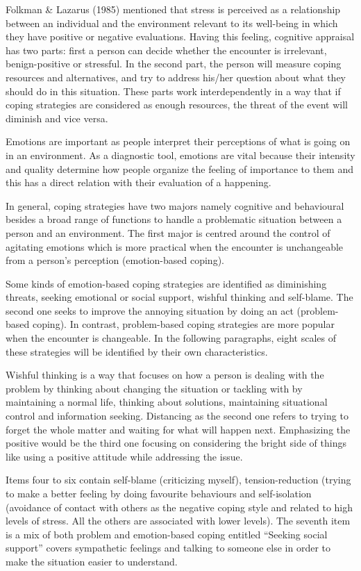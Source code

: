 \documentclass[
11pt, %
oneside, %
english, %
singlespacing, %
]{macthesis} %
\begin{document}
Folkman \& Lazarus (1985) mentioned that stress is perceived as a relationship between an individual and the environment relevant to its well-being in which they have positive or negative evaluations. Having this feeling, cognitive appraisal has two parts: first a person can decide whether the encounter is irrelevant, benign-positive or stressful. In the second part, the person will measure coping resources and alternatives, and try to address his/her question about what they should do in this situation. These parts work interdependently in a way that if coping strategies are considered as enough resources, the threat of the event will diminish and vice versa.

Emotions are important as people interpret their perceptions of what is going on in an environment. As a diagnostic tool, emotions are vital because their intensity and quality determine how people organize the feeling of importance to them and this has a direct relation with their evaluation of a happening.

In general, coping strategies have two majors namely cognitive and behavioural besides a broad range of functions to handle a problematic situation between a person and an environment. The first major is centred around the control of agitating emotions which is more practical when the encounter is unchangeable from a person's perception (emotion-based coping).

Some kinds of emotion-based coping strategies are identified as diminishing threats, seeking emotional or social support, wishful thinking and self-blame. The second one seeks to improve the annoying situation by doing an act (problem-based coping). In contrast, problem-based coping strategies are more popular when the encounter is changeable. In the following paragraphs, eight scales of these strategies will be identified by their own characteristics.

Wishful thinking is a way that focuses on how a person is dealing with the problem by thinking about changing the situation or tackling with by maintaining a normal life, thinking about solutions, maintaining situational control and information seeking. Distancing as the second one refers to trying to forget the whole matter and waiting for what will happen next. Emphasizing the positive would be the third one focusing on considering the bright side of things like using a positive attitude while addressing the issue.

Items four to six contain self-blame (criticizing myself), tension-reduction (trying to make a better feeling by doing favourite behaviours and self-isolation (avoidance of contact with others as the negative coping style and related to high levels of stress. All the others are associated with lower levels). The seventh item is a mix of both problem and emotion-based coping entitled ``Seeking social support'' covers sympathetic feelings and talking to someone else in order to make the situation easier to understand.
\end{document}
